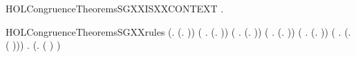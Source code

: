 \newcommand{\HOLCongruenceTheoremsSGXXind}{\UseVerbatim{HOLCongruenceTheoremsSGXXind}}
\begin{SaveVerbatim}{HOLCongruenceTheoremsSGXXISXXCONTEXT}
\HOLTokenTurnstile{} \HOLSymConst{\HOLTokenForall{}}.   \HOLSymConst{\HOLTokenImp{}}  
\end{SaveVerbatim}
\newcommand{\HOLCongruenceTheoremsSGXXISXXCONTEXT}{\UseVerbatim{HOLCongruenceTheoremsSGXXISXXCONTEXT}}
\begin{SaveVerbatim}{HOLCongruenceTheoremsSGXXrules}
\HOLTokenTurnstile{} (\HOLSymConst{\HOLTokenForall{}}.  (\HOLTokenLambda{}. )) \HOLSymConst{\HOLTokenConj{}}
   (\HOLSymConst{\HOLTokenForall{}} .   \HOLSymConst{\HOLTokenImp{}}  (\HOLTokenLambda{}.   )) \HOLSymConst{\HOLTokenConj{}}
   (\HOLSymConst{\HOLTokenForall{}} .   \HOLSymConst{\HOLTokenImp{}}  (\HOLTokenLambda{}.  )) \HOLSymConst{\HOLTokenConj{}}
   (\HOLSymConst{\HOLTokenForall{}} .   \HOLSymConst{\HOLTokenConj{}}   \HOLSymConst{\HOLTokenImp{}}  (\HOLTokenLambda{}.   \HOLSymConst{+}  )) \HOLSymConst{\HOLTokenConj{}}
   (\HOLSymConst{\HOLTokenForall{}} .   \HOLSymConst{\HOLTokenConj{}}   \HOLSymConst{\HOLTokenImp{}}  (\HOLTokenLambda{}.   \HOLSymConst{\ensuremath{\parallel}}  )) \HOLSymConst{\HOLTokenConj{}}
   (\HOLSymConst{\HOLTokenForall{}} .   \HOLSymConst{\HOLTokenImp{}}  (\HOLTokenLambda{}. \HOLConst{\ensuremath{\nu}}  ( ))) \HOLSymConst{\HOLTokenConj{}}
   \HOLSymConst{\HOLTokenForall{}} .   \HOLSymConst{\HOLTokenImp{}}  (\HOLTokenLambda{}.  ( ) )
\end{SaveVerbatim}
